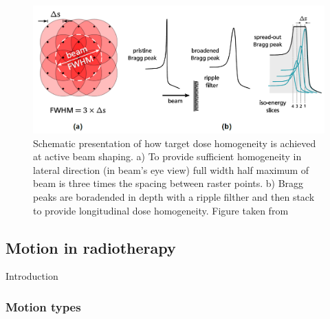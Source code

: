 \documentclass[type=dr, dr=rernat, accentcolor=tud7b,colorbacktitle, bigchapter, openright, twoside, 12pt ]{tudthesis}
\begin{document}
\begin{figure}[H]
\begin{center}
\includegraphics[scale=0.45]{./Images/active.png}
\caption{Schematic presentation of how target dose homogeneity is achieved at active beam shaping. a) To provide sufficient homogeneity in lateral direction (in beam's eye view) full width
half maximum of beam is three times the spacing between raster points. b) Bragg peaks are boradended in depth with a ripple filther and then stack to provide longitudinal dose homogeneity. 
Figure taken from \cite{Richter2012}}
\label{active}
\end{center}
\end{figure}


\newpage

\subsection{Motion in radiotherapy}
\label{sec:motion}

Introduction


\subsubsection{Motion types}
\end{document}

